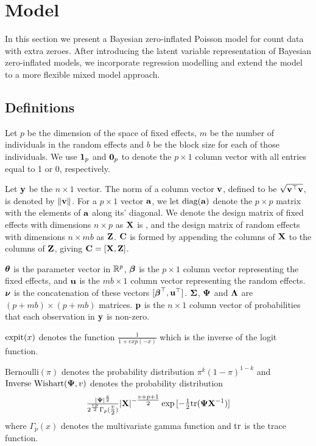 \documentclass{amsart}[12pt]
\begin{document}
\section{Model}
\label{sec:model}

In this section we present a Bayesian zero-inflated Poisson model for count data with extra zeroes. After
introducing the latent variable representation of Bayesian zero-inflated models, we incorporate regression
modelling and extend the model to a more flexible mixed model approach.

\subsection{Definitions}

Let $p$ be the dimension of the space of fixed effects, $m$ be the number of individuals in the random effects
and $b$ be the block size for each of those individuals. We use ${\bf 1}_p$ and ${\bf 0}_p$ to denote the $p
\times 1$ column vector with all entries equal to 1 or 0, respectively.

Let ${\bf y}$ be the $n \times 1$ vector. The norm of a column vector ${\bf v}$, defined to be $\sqrt{{\bf v}^\top {\bf v}}$,
is  denoted by $\|{\bf v}\|$. For a $p \times 1$ vector ${\bf a}$, we let $\text{diag}{({\bf a})}$ denote the $p \times p$
matrix with the elements of ${\bf a}$ along its' diagonal. We denote the design matrix of fixed effects with
dimensions $n \times p$ as ${\bf X}$ is , and the design matrix of random  effects with dimensions $n \times m b$
as ${\bf Z}$.  ${\bf C}$ is formed by appending the columns of ${\bf X}$ to the columns of ${\bf Z}$, giving ${\bf C} = [ {\bf X}, {\bf Z}
]$.

${\boldsymbol \theta}$ is the parameter vector in ${\mathbb{R}}^p$, ${\boldsymbol \beta}$ is the $p \times 1$ column vector representing the fixed
effects, and ${\bf u}$ is the $m b \times 1$ column vector representing the random effects. ${\boldsymbol \nu}$ is the
concatenation of these vectors  $[{\boldsymbol \beta}^\top, {\bf u}^\top]$. ${\boldsymbol \Sigma}$, ${\boldsymbol \Psi}$ and ${\boldsymbol \Lambda}$ are $(p + m b) \times
(p + m b)$ matrices. ${\bf p}$ is the $n \times 1$ column vector of probabilities that each observation in ${\bf y}$ is
non-zero.

\noindent $\text{expit} (x)$ denotes the function $\tfrac{1}{1 + exp(-x)}$ which is the inverse of the logit
function.

\noindent $\text{Bernoulli}(\pi)$ denotes the probability distribution $\pi^k (1 - \pi)^{1-k}$ and
$\text{Inverse Wishart}({\boldsymbol \Psi}, v)$ denotes the probability distribution
$$\tfrac{|{\boldsymbol \Psi}|^\frac{v}{2}}{2^{\frac{vp}{2}} \Gamma_p{(\tfrac{v}{2})}} |{\bf X}|^{-\tfrac{v + p + 1}{2}}
\exp{[- \tfrac{1}{2} \text{tr}{({\boldsymbol\Psi}{\bf X}^{-1})}]}$$ where $\Gamma_p{(x)}$ denotes the multivariate gamma function and $\text{tr}$
is the trace function.
\end{document}
